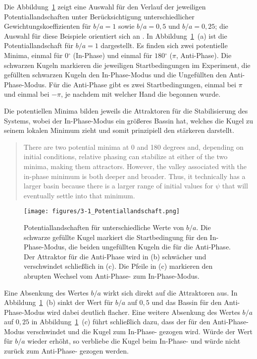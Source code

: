 Die Abbildung~\ref{figure:0301} zeigt eine Auswahl für den Verlauf der jeweiligen Potentiallandschaften unter Berücksichtigung unterschiedlicher Gewichtungskoeffizienten für  $b/a=1$ sowie  $b/a=0,5$ und  $b/a=0,25$; die Auswahl für diese Beispiele orientiert sich an \citet{Nam2009b}. In Abbildung~\ref{figure:0301}~(a) ist die Potentiallandschaft für $b/a=1$ dargestellt. Es finden sich zwei potentielle Minima, einmal für $0{}^{\circ}$ (In-Phase) und einmal für  $180{}^{\circ}$ ($\pi$, Anti-Phase). Die schwarzen Kugeln markieren die jeweiligen Startbedingungen im Experiment, die gefüllten schwarzen Kugeln den In-Phase-Modus und die Ungefüllten den Anti-Phase-Modus. Für die Anti-Phase gibt es zwei Startbedingungen, einmal bei $\pi$ und einmal bei $-\pi$, je nachdem mit welcher Hand die  begonnen wurde. 

Die potentiellen Minima bilden jeweils die Attraktoren für die Stabilisierung des Systems, wobei der In-Phase-Modus ein größeres Bassin hat, welches die Kugel zu seinem lokalen Minimum zieht und somit prinzipiell den stärkeren  darstellt. 

\begin{quote}
	There are two potential minima at 0 and 180 degrees and, depending on initial conditions, relative phasing can stabilize at either of the two minima, making them attractors. However, the valley associated with the in-phase minimum is both deeper and broader. Thus, it technically has a larger basin because there is a larger range of initial values for  $\psi $ that will eventually settle into that minimum. \citep[][304]{Nam2009b}
\end{quote}

\begin{figure}[b]
	\texttt{[image: figures/3-1\_Potentiallandschaft.png]}
	\caption{Potentiallandschaften für unterschiedliche Werte von $b/{a}$. Die schwarze gefüllte Kugel markiert die Startbedingung für den In-Phase-Modus, die beiden ungefüllten Kugeln die für die Anti-Phase. Der Attraktor für die Anti-Phase wird in (b) schwächer und verschwindet schließlich in (c). Die Pfeile in (c) markieren den abrupten Wechsel vom Anti-Phase- zum In-Phase-Modus.}
	\label{figure:0301}
\end{figure}

Eine Absenkung des Wertes $b/{a}$ wirkt sich direkt auf die Attraktoren aus. In Abbildung~\ref{figure:0301}~(b) sinkt der Wert für $b/{a}$ auf $0,5$ und das Bassin für den Anti-Phase-Modus wird dabei deutlich flacher. Eine weitere Absenkung des Wertes $b/{a}$ auf $0,25$ in Abbildung~\ref{figure:0301}~(c) führt schließlich dazu, dass der  für den Anti-Phase-Modus verschwindet und die Kugel zum In-Phase- gezogen wird. Würde der Wert für $b/{a}$ wieder erhöht, so verbliebe die Kugel beim In-Phase- und würde nicht zurück zum Anti-Phase- gezogen werden.



